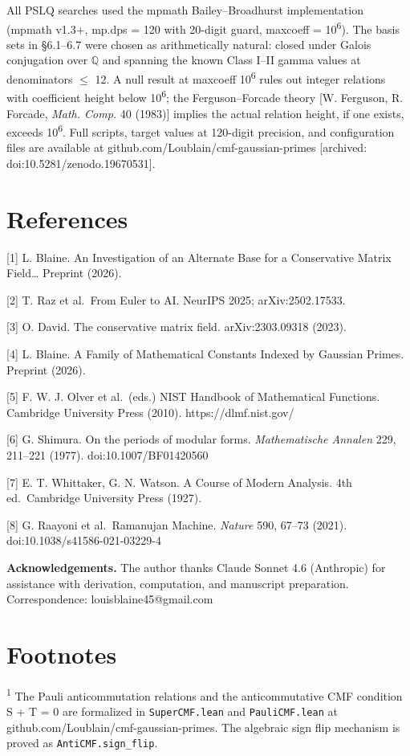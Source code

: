 \documentclass[11pt]{article}
\begin{document}
All PSLQ searches used the mpmath Bailey--Broadhurst implementation
(mpmath v1.3+, mp.dps = 120 with 20-digit guard, maxcoeff =
10\textsuperscript{6}). The basis sets in §6.1--6.7 were chosen as
arithmetically natural: closed under Galois conjugation over
\(\mathbb{Q}\) and spanning the known Class I--II gamma values at
denominators \(\leq\) 12. A null result at maxcoeff
10\textsuperscript{6} rules out integer relations with coefficient
height below 10\textsuperscript{6}; the Ferguson--Forcade theory {[}W.
Ferguson, R. Forcade, \emph{Math. Comp.} 40 (1983){]} implies the actual
relation height, if one exists, exceeds 10\textsuperscript{6}. Full
scripts, target values at 120-digit precision, and configuration files
are available at github.com/Loublain/cmf-gaussian-primes {[}archived:
doi:10.5281/zenodo.19670531{]}.

\hypertarget{references}{%
\section{References}\label{references}}

{[}1{]} L. Blaine. An Investigation of an Alternate Base for a
Conservative Matrix Field\ldots{} Preprint (2026).

{[}2{]} T. Raz et al.~From Euler to AI. NeurIPS 2025; arXiv:2502.17533.

{[}3{]} O. David. The conservative matrix field. arXiv:2303.09318
(2023).

{[}4{]} L. Blaine. A Family of Mathematical Constants Indexed by
Gaussian Primes. Preprint (2026).

{[}5{]} F. W. J. Olver et al.~(eds.) NIST Handbook of Mathematical
Functions. Cambridge University Press (2010). https://dlmf.nist.gov/

{[}6{]} G. Shimura. On the periods of modular forms. \emph{Mathematische
Annalen} 229, 211--221 (1977). doi:10.1007/BF01420560

{[}7{]} E. T. Whittaker, G. N. Watson. A Course of Modern Analysis. 4th
ed.~Cambridge University Press (1927).

{[}8{]} G. Raayoni et al.~Ramanujan Machine. \emph{Nature} 590, 67--73
(2021). doi:10.1038/s41586-021-03229-4

\textbf{Acknowledgements.} The author thanks Claude Sonnet 4.6
(Anthropic) for assistance with derivation, computation, and manuscript
preparation. Correspondence: louisblaine45@gmail.com

\hypertarget{footnotes}{%
\section{Footnotes}\label{footnotes}}

\textsuperscript{1} The Pauli anticommutation relations and the
anticommutative CMF condition S + T = 0 are formalized in
\texttt{SuperCMF.lean} and \texttt{PauliCMF.lean} at
github.com/Loublain/cmf-gaussian-primes. The algebraic sign flip
mechanism is proved as \texttt{AntiCMF.sign\_flip}.
\end{document}
